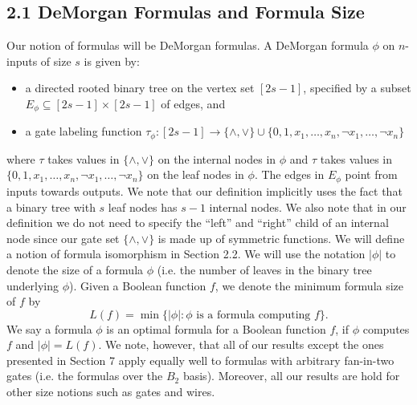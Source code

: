 \documentclass[10pt,a4paper]{article}
\begin{document}
\subsection*{2.1 DeMorgan Formulas and Formula Size}
Our notion of formulas will be DeMorgan formulas. A DeMorgan formula $\phi$ on $n$-inputs of size $s$ is given by:
\begin{itemize}
\item a directed rooted binary tree on the vertex set $[2s-1]$, specified by a subset $E_\phi\subseteq[2s-1]\times[2s-1]$ of edges, and
\item a gate labeling function $\tau_\phi:[2s-1]\to\{\land,\lor\}\cup\{0,1,x_1,\ldots,x_n,\neg x_1,\ldots,\neg x_n\}$
\end{itemize}
where $\tau$ takes values in $\{\land,\lor\}$ on the internal nodes in $\phi$ and $\tau$ takes values in $\{0,1,x_1,\ldots,x_n,\neg x_1,\ldots,\neg x_n\}$ on the leaf nodes in $\phi$. The edges in $E_\phi$ point from inputs towards outputs. We note that our definition implicitly uses the fact that a binary tree with $s$ leaf nodes has $s-1$ internal nodes. We also note that in our definition we do not need to specify the ``left'' and ``right'' child of an internal node since our gate set $\{\land,\lor\}$ is made up of symmetric functions. We will define a notion of formula isomorphism in Section 2.2.
We will use the notation $|\phi|$ to denote the size of a formula $\phi$ (i.e. the number of leaves in the binary tree underlying $\phi$). Given a Boolean function $f$, we denote the minimum formula size of $f$ by
\[L(f)=\min\{|\phi|:\phi\text{ is a formula computing }f\}.\]
We say a formula $\phi$ is an optimal formula for a Boolean function $f$, if $\phi$ computes $f$ and $|\phi|=L(f)$.
We note, however, that all of our results except the ones presented in Section 7 apply equally well to formulas with arbitrary fan-in-two gates (i.e. the formulas over the $B_2$ basis). Moreover, all our results are hold for other size notions such as gates and wires.
\end{document}
